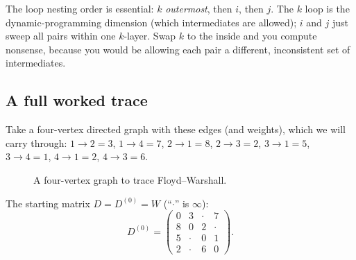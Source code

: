 \begin{focusbox}
The loop nesting order is essential: $k$ \emph{outermost}, then $i$, then $j$. The
$k$ loop is the dynamic-programming dimension (which intermediates are
allowed); $i$ and $j$ just sweep all pairs within one $k$-layer. Swap $k$ to
the inside and you compute nonsense, because you would be allowing each pair a
different, inconsistent set of intermediates.
\end{focusbox}

\subsection{A full worked trace}

\begin{labbox}
Take a four-vertex directed graph with these edges (and weights), which we will
carry through:
$1\!\to\!2 = 3$, $1\!\to\!4 = 7$, $2\!\to\!1 = 8$, $2\!\to\!3 = 2$,
$3\!\to\!1 = 5$, $3\!\to\!4 = 1$, $4\!\to\!1 = 2$, $4\!\to\!3 = 6$.

\begin{figure}[H]
\centering
{}
\caption{A four-vertex graph to trace Floyd--Warshall.}
\label{ch25:fig-lab2}
\end{figure}

The starting matrix $D = D^{(0)} = W$ (``$\cdot$'' is $\infty$):
\[
D^{(0)}=
\begin{pmatrix}
0 & 3 & \cdot & 7\\
8 & 0 & 2 & \cdot\\
5 & \cdot & 0 & 1\\
2 & \cdot & 6 & 0
\end{pmatrix}.
\]


\end{labbox}
